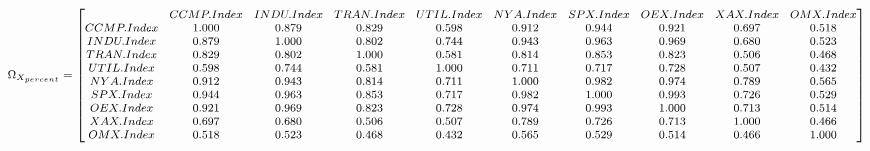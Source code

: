 \documentclass{article}
\begin{document}
	\begin{equation*}
		\begin{medsize}
\Omega_{X_{percent}} = %
\begin{bmatrix}{}
& CCMP.Index & INDU.Index & TRAN.Index & UTIL.Index & NYA.Index & SPX.Index & OEX.Index & XAX.Index & OMX.Index \\
  CCMP.Index & 1.000 & 0.879 & 0.829 & 0.598 & 0.912 & 0.944 & 0.921 & 0.697 & 0.518 \\ 
  INDU.Index & 0.879 & 1.000 & 0.802 & 0.744 & 0.943 & 0.963 & 0.969 & 0.680 & 0.523 \\ 
  TRAN.Index & 0.829 & 0.802 & 1.000 & 0.581 & 0.814 & 0.853 & 0.823 & 0.506 & 0.468 \\ 
  UTIL.Index & 0.598 & 0.744 & 0.581 & 1.000 & 0.711 & 0.717 & 0.728 & 0.507 & 0.432 \\ 
  NYA.Index & 0.912 & 0.943 & 0.814 & 0.711 & 1.000 & 0.982 & 0.974 & 0.789 & 0.565 \\ 
  SPX.Index & 0.944 & 0.963 & 0.853 & 0.717 & 0.982 & 1.000 & 0.993 & 0.726 & 0.529 \\ 
  OEX.Index & 0.921 & 0.969 & 0.823 & 0.728 & 0.974 & 0.993 & 1.000 & 0.713 & 0.514 \\ 
  XAX.Index & 0.697 & 0.680 & 0.506 & 0.507 & 0.789 & 0.726 & 0.713 & 1.000 & 0.466 \\ 
  OMX.Index & 0.518 & 0.523 & 0.468 & 0.432 & 0.565 & 0.529 & 0.514 & 0.466 & 1.000 \\ 
  \end{bmatrix}
\end{medsize}
\end{equation*}
\end{document}
